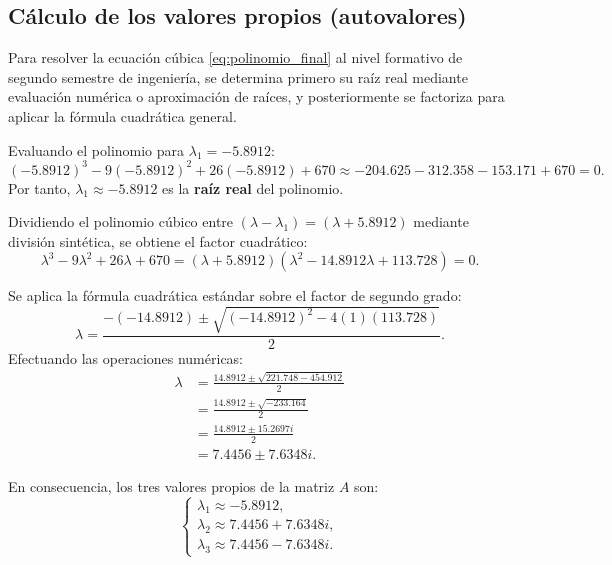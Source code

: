 \documentclass[spanish,letterpaper,oneside]{article}
\begin{document}
\subsection{Cálculo de los valores propios (autovalores)}

Para resolver la ecuación cúbica \eqref{eq:polinomio_final} al nivel formativo de segundo semestre de ingeniería, se determina primero su raíz real mediante evaluación numérica o aproximación de raíces, y posteriormente se factoriza para aplicar la fórmula cuadrática general.

Evaluando el polinomio para $\lambda_1 = -5.8912$:
\begin{equation}
(-5.8912)^3 - 9(-5.8912)^2 + 26(-5.8912) + 670 \approx -204.625 - 312.358 - 153.171 + 670 = 0.
\end{equation}
Por tanto, $\lambda_1 \approx -5.8912$ es la \textbf{raíz real} del polinomio.

Dividiendo el polinomio cúbico entre $(\lambda - \lambda_1) = (\lambda + 5.8912)$ mediante división sintética, se obtiene el factor cuadrático:
\begin{equation}
\lambda^3 - 9\lambda^2 + 26\lambda + 670 = (\lambda + 5.8912)(\lambda^2 - 14.8912\lambda + 113.728) = 0.
\end{equation}

Se aplica la fórmula cuadrática estándar sobre el factor de segundo grado:
\begin{equation}
\lambda = \frac{-(-14.8912) \pm \sqrt{(-14.8912)^2 - 4(1)(113.728)}}{2}.
\end{equation}
Efectuando las operaciones numéricas:
\begin{align}
\lambda &= \frac{14.8912 \pm \sqrt{221.748 - 454.912}}{2} \nonumber \\
&= \frac{14.8912 \pm \sqrt{-233.164}}{2} \nonumber \\
&= \frac{14.8912 \pm 15.2697i}{2} \nonumber \\
&= 7.4456 \pm 7.6348i.
\end{align}

En consecuencia, los tres valores propios de la matriz $A$ son:
\begin{equation}
\begin{cases}
\lambda_1 \approx -5.8912, \\
\lambda_2 \approx 7.4456 + 7.6348i, \\
\lambda_3 \approx 7.4456 - 7.6348i.
\end{cases}
\end{equation}
\end{document}
